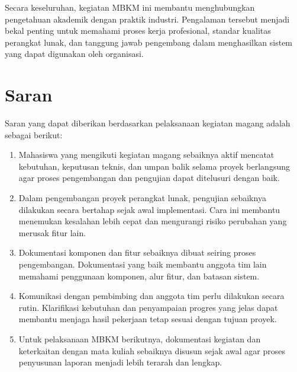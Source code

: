 Secara keseluruhan, kegiatan MBKM ini membantu menghubungkan pengetahuan akademik dengan praktik industri. Pengalaman tersebut menjadi bekal penting untuk memahami proses kerja profesional, standar kualitas perangkat lunak, dan tanggung jawab pengembang dalam menghasilkan sistem yang dapat digunakan oleh organisasi.

\section{Saran}
Saran yang dapat diberikan berdasarkan pelaksanaan kegiatan magang adalah sebagai berikut:
\begin{enumerate}
    \item Mahasiswa yang mengikuti kegiatan magang sebaiknya aktif mencatat kebutuhan, keputusan teknis, dan umpan balik selama proyek berlangsung agar proses pengembangan dan pengujian dapat ditelusuri dengan baik.
    \item Dalam pengembangan proyek perangkat lunak, pengujian sebaiknya dilakukan secara bertahap sejak awal implementasi. Cara ini membantu menemukan kesalahan lebih cepat dan mengurangi risiko perubahan yang merusak fitur lain.
    \item Dokumentasi komponen dan fitur sebaiknya dibuat seiring proses pengembangan. Dokumentasi yang baik membantu anggota tim lain memahami penggunaan komponen, alur fitur, dan batasan sistem.
    \item Komunikasi dengan pembimbing dan anggota tim perlu dilakukan secara rutin. Klarifikasi kebutuhan dan penyampaian progres yang jelas dapat membantu menjaga hasil pekerjaan tetap sesuai dengan tujuan proyek.
    \item Untuk pelaksanaan MBKM berikutnya, dokumentasi kegiatan dan keterkaitan dengan mata kuliah sebaiknya disusun sejak awal agar proses penyusunan laporan menjadi lebih terarah dan lengkap.
\end{enumerate}
